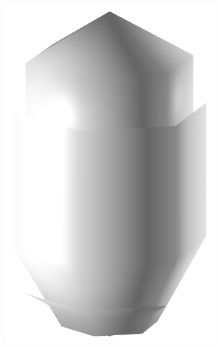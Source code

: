 \begin{figure}
\begin{center}
\begin{subfigure}{0.24\textwidth}
    \includegraphics[width=\linewidth]{assets/images/shapes/bugold/bad_mesh_low}
    \caption{}
    \end{subfigure}
    \begin{subfigure}{0.24\textwidth}

\end{subfigure}
\end{center}
\end{figure}

